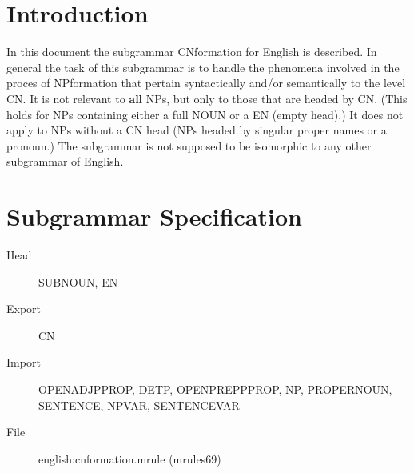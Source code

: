 

   \RosDate{\today}
   \RosSupersedes{-}
   \MakeRosTitle
%
%


\section{Introduction}
In this document the subgrammar CNformation for English is described.
In general the task of this subgrammar 
is to handle the phenomena involved in the proces of NPformation that pertain 
syntactically and/or semantically to the level CN.
It is not relevant to {\bf all} 
NPs, but only to those 
that are headed by CN. (This holds for NPs containing either a full NOUN or a 
EN (empty head).)
It does not apply to NPs without a CN head (NPs 
headed by singular proper names or a pronoun.)
The subgrammar is not supposed to be isomorphic to any other subgrammar 
of English. 

\section{Subgrammar Specification}

\begin{description}
  \item[Head] SUBNOUN, EN
  \item[Export] CN
  \item[Import] 
OPENADJPPROP,  DETP, OPENPREPPPROP, 
NP, PROPERNOUN, SENTENCE, NPVAR, SENTENCEVAR

\item[File] english:cnformation.mrule (mrules69)
\end{description}

